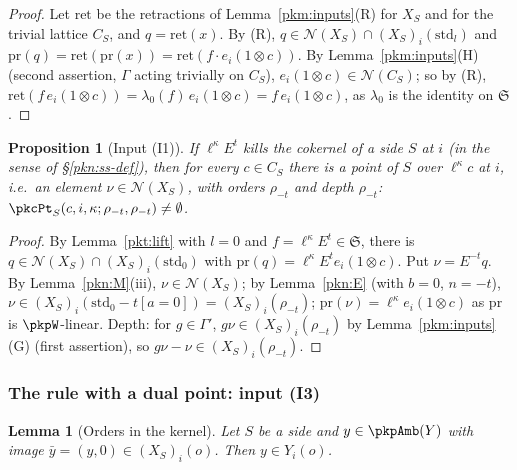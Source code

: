 \documentclass[10pt]{amsart}
\newtheorem{proposition}[theorem]{Proposition}
\newtheorem{lemma}[theorem]{Lemma}
\theoremstyle{definition}
\theoremstyle{remark}
\begin{document}
\begin{proof}
Let $\mathrm{ret}$ be the retractions of Lemma~\ref{pkm:inputs}(R) for $X_S$ and for the trivial lattice
$C_S$, and $q=\mathrm{ret}(x)$. By (R), $q\in\mathcal N(X_S)\cap(X_S)_i(\mathrm{std}_l)$ and $\mathrm{pr}(q)=
\mathrm{ret}(\mathrm{pr}(x))=\mathrm{ret}(f\cdot e_i(1\otimes c))$. By Lemma~\ref{pkm:inputs}(H) (second
assertion, $\Gamma$ acting trivially on $C_S$), $e_i(1\otimes c)\in\mathcal N(C_S)$; so by (R),
$\mathrm{ret}(f\,e_i(1\otimes c))=\lambda_0(f)\,e_i(1\otimes c)=f\,e_i(1\otimes c)$, as $\lambda_0$ is the
identity on $\mathfrak S$.
\end{proof}

\begin{proposition}[Input (I1)]\label{pkt:I1}
If $\ell^\kappa E^t$ kills the cokernel of a side $S$ at $i$ (in the sense of \S\ref{pkn:ss-def}), then
for every $c\in C_S$ there is a point of $S$ over $\ell^\kappa c$ at $i$, i.e.\ an element $\nu\in\mathcal
N(X_S)$, with orders $\rho_{-t}$ and depth $\rho_{-t}$: $\pkcPt_S(c,i,\kappa;\rho_{-t},\rho_{-t})\ne\emptyset$.
\end{proposition}

\begin{proof}
By Lemma~\ref{pkt:lift} with $l=0$ and $f=\ell^\kappa E^t\in\mathfrak S$, there is $q\in\mathcal N(X_S)\cap
(X_S)_i(\mathrm{std}_0)$ with $\mathrm{pr}(q)=\ell^\kappa E^te_i(1\otimes c)$. Put $\nu=E^{-t}q$. By
Lemma~\ref{pkn:M}(iii), $\nu\in\mathcal N(X_S)$; by Lemma~\ref{pkn:E} (with $b=0$, $n=-t$), $\nu\in
(X_S)_i(\mathrm{std}_0-t[a=0])=(X_S)_i(\rho_{-t})$; $\mathrm{pr}(\nu)=\ell^\kappa e_i(1\otimes c)$ as $\mathrm{pr}$
is $\pkpW$-linear. Depth: for $g\in\Gamma'$, $g\nu\in(X_S)_i(\rho_{-t})$ by Lemma~\ref{pkm:inputs}(G) (first
assertion), so $g\nu-\nu\in(X_S)_i(\rho_{-t})$.
\end{proof}

\subsubsection{The rule with a dual point: input (I3)}\label{pkt:ss-I3}

\begin{lemma}[Orders in the kernel]\label{pkt:sub}
Let $S$ be a side and $y\in\pkpAmb(Y)$ with image $\bar y=(y,0)\in(X_S)_i(o)$. Then $y\in Y_i(o)$.
\end{lemma}
\end{document}
